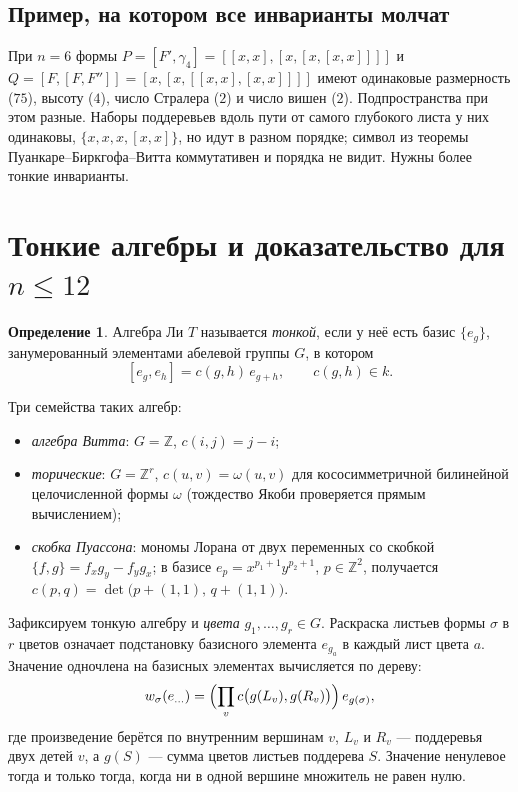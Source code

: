 \documentclass[11pt]{article}
\newcommand{\Z}{\mathbb Z}
\newcommand{\g}{\gamma}
\theoremstyle{plain}
\theoremstyle{definition}
\newtheorem{definition}[theorem]{Определение}
\theoremstyle{remark}
\begin{document}
\subsection{Пример, на котором все инварианты молчат}

При $n=6$ формы $P=[F',\g_4]=[[x,x],[x,[x,[x,x]]]]$ и $Q=[F,[F,F'']]=[x,[x,[[x,x],[x,x]]]]$ имеют одинаковые размерность ($75$), высоту ($4$), число Стралера ($2$) и число вишен ($2$). Подпространства при этом разные. Наборы поддеревьев вдоль пути от самого глубокого листа у них одинаковы, $\{x,x,x,[x,x]\}$, но идут в разном порядке; символ из теоремы Пуанкаре--Биркгофа--Витта коммутативен и порядка не видит. Нужны более тонкие инварианты.

\section{Тонкие алгебры и доказательство для $n\le12$}\label{sec:thin}

\begin{definition}
Алгебра Ли $T$ называется \emph{тонкой}, если у неё есть базис $\{e_g\}$, занумерованный элементами абелевой группы $G$, в котором
\[ [e_g,e_h]=c(g,h)\,e_{g+h},\qquad c(g,h)\in k. \]
\end{definition}

Три семейства таких алгебр:
\begin{itemize}
\item \emph{алгебра Витта}: $G=\Z$, $c(i,j)=j-i$;
\item \emph{торические}: $G=\Z^r$, $c(u,v)=\omega(u,v)$ для кососимметричной билинейной целочисленной формы $\omega$ (тождество Якоби проверяется прямым вычислением);
\item \emph{скобка Пуассона}: мономы Лорана от двух переменных со скобкой $\{f,g\}=f_xg_y-f_yg_x$; в базисе $e_p=x^{p_1+1}y^{p_2+1}$, $p\in\Z^2$, получается $c(p,q)=\det\bigl(p+(1,1),\,q+(1,1)\bigr)$.
\end{itemize}

Зафиксируем тонкую алгебру и \emph{цвета} $g_1,\dots,g_r\in G$. Раскраска листьев формы $\sigma$ в $r$ цветов означает подстановку базисного элемента $e_{g_a}$ в каждый лист цвета $a$. Значение одночлена на базисных элементах вычисляется по дереву:
\begin{equation}\label{eq:value}
w_\sigma(e_{\ldots})=\Bigl(\prod_{v} c\bigl(g(L_v),g(R_v)\bigr)\Bigr)\,e_{g(\sigma)},
\end{equation}
где произведение берётся по внутренним вершинам $v$, $L_v$ и $R_v$ --- поддеревья двух детей $v$, а $g(S)$ --- сумма цветов листьев поддерева $S$. Значение ненулевое тогда и только тогда, когда ни в одной вершине множитель не равен нулю.
\end{document}
